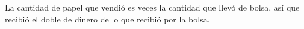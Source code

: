 La cantidad de papel que vendió es \fillin[diez] veces la cantidad que llevó de bolsa, así que recibió el doble de dinero de lo que recibió por la bolsa.